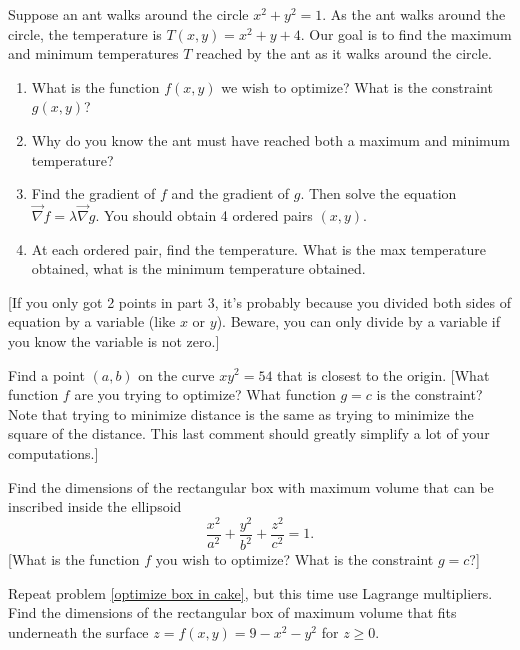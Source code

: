 \begin{problem}
 Suppose an ant walks around the circle $x^2+y^2=1$.  As the ant walks around the circle, the temperature is $T(x,y) = x^2+y+4$.  Our goal is to find the maximum and minimum temperatures $T$ reached by the ant as it walks around the circle. 
 \begin{enumerate}
  \item What is the function $f(x,y)$ we wish to optimize? What is the constraint $g(x,y)$?
  \item Why do you know the ant must have reached both a maximum and minimum temperature?
  \item Find the gradient of $f$ and the gradient of $g$.  Then solve the equation $\vec \nabla f = \lambda \vec \nabla g.$ You should obtain 4 ordered pairs $(x,y)$.
  \item At each ordered pair, find the temperature.  What is the max temperature obtained, what is the minimum temperature obtained.
 \end{enumerate}
[If you only got 2 points in part 3, it's probably because you divided both sides of equation by a variable (like $x$ or $y$).  Beware, you can only divide by a variable if you know the variable is not zero.]
\end{problem}

\begin{problem}
 Find a point $(a,b)$ on the curve $xy^2=54$ that is closest to the origin.  [What function $f$ are you trying to optimize? What function $g=c$ is the constraint? Note that trying to minimize distance is the same as trying to minimize the square of the distance. This last comment should greatly simplify a lot of your computations.]
\end{problem}

\begin{problem}
 Find the dimensions of the rectangular box with maximum volume that can be inscribed inside the ellipsoid $$\frac{x^2}{a^2}+\frac{y^2}{b^2}+\frac{z^2}{c^2}=1.$$
[What is the function $f$ you wish to optimize? What is the constraint $g=c$?]
\end{problem}

\begin{problem}
Repeat problem \ref{optimize box in cake}, but this time use Lagrange multipliers.
Find the dimensions of the rectangular box of maximum volume that fits underneath the surface $z=f(x,y)=9-x^2-y^2$ for $z\geq 0$.
\end{problem}




